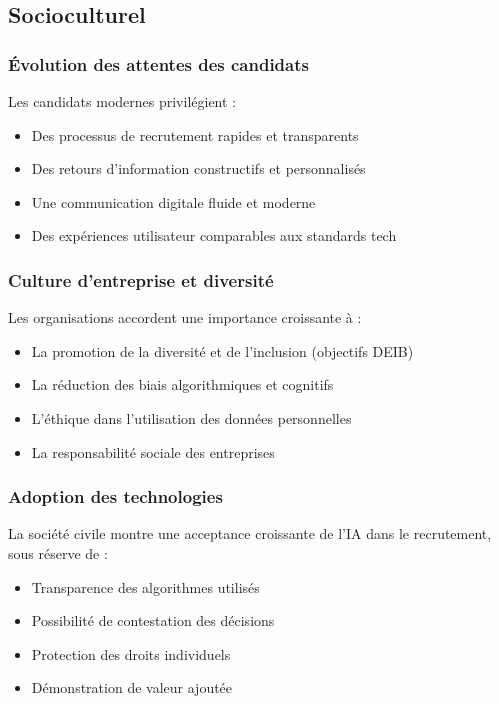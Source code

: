 \documentclass[12pt,a4paper]{report}
\begin{document}
\subsection{Socioculturel}

\subsubsection{Évolution des attentes des candidats}

Les candidats modernes privilégient :
\begin{itemize}
\item Des processus de recrutement rapides et transparents
\item Des retours d'information constructifs et personnalisés
\item Une communication digitale fluide et moderne
\item Des expériences utilisateur comparables aux standards tech
\end{itemize}

\subsubsection{Culture d'entreprise et diversité}

Les organisations accordent une importance croissante à :
\begin{itemize}
\item La promotion de la diversité et de l'inclusion (objectifs DEIB)
\item La réduction des biais algorithmiques et cognitifs
\item L'éthique dans l'utilisation des données personnelles
\item La responsabilité sociale des entreprises
\end{itemize}

\subsubsection{Adoption des technologies}

La société civile montre une acceptance croissante de l'IA dans le recrutement, sous réserve de :
\begin{itemize}
\item Transparence des algorithmes utilisés
\item Possibilité de contestation des décisions
\item Protection des droits individuels
\item Démonstration de valeur ajoutée
\end{itemize}
\end{document}
